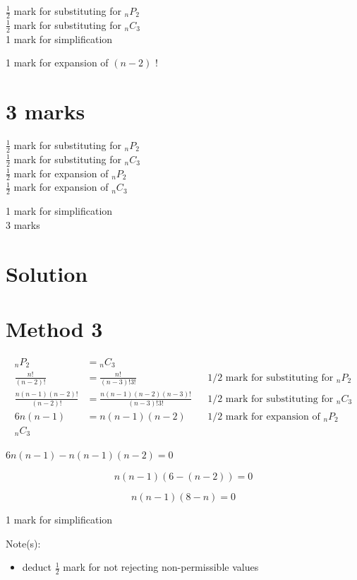 \documentclass[10pt]{article}
\begin{document}
$\frac{1}{2}$ mark for substituting for ${ }_{n} P_{2}$\\
$\frac{1}{2}$ mark for substituting for ${ }_{n} C_{3}$\\
1 mark for simplification

1 mark for expansion of $(n-2)$ !

\section*{3 marks}
$\frac{1}{2}$ mark for substituting for ${ }_{n} P_{2}$\\
$\frac{1}{2}$ mark for substituting for ${ }_{n} C_{3}$\\
$\frac{1}{2}$ mark for expansion of ${ }_{n} P_{2}$\\
$\frac{1}{2}$ mark for expansion of ${ }_{n} C_{3}$

1 mark for simplification\\
3 marks

\section*{Solution}
\section*{Method 3}
$$
\begin{array}{rlrl}
{ }_{n} P_{2} & ={ }_{n} C_{3} & & \\
\frac{n!}{(n-2)!} & =\frac{n!}{(n-3)!3!} & & 1 / 2 \text { mark for substituting for }{ }_{n} P_{2} \\
\frac{n(n-1)(n-2)!}{(n-2)!} & =\frac{n(n-1)(n-2)(n-3)!}{(n-3)!3!} & & 1 / 2 \text { mark for substituting for }{ }_{n} C_{3} \\
6 n(n-1) & =n(n-1)(n-2) & & 1 / 2 \text { mark for expansion of }{ }_{n} P_{2} \\
{ }_{n} C_{3} & &
\end{array}
$$

$6 n(n-1)-n(n-1)(n-2)=0$

$$
n(n-1)(6-(n-2))=0
$$

$$
n(n-1)(8-n)=0
$$

1 mark for simplification

Note(s):

\begin{itemize}
  \item deduct $\frac{1}{2}$ mark for not rejecting non-permissible values
\end{itemize}
\end{document}
